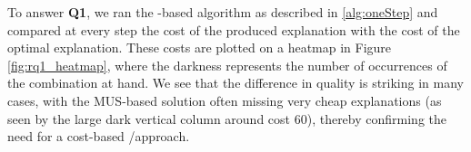 To answer \textbf{Q1}, we ran the -based algorithm as described in \cref{alg:oneStep} and compared at every step the cost of the produced explanation with the cost of the optimal explanation. 
% 
These costs are plotted on a heatmap in Figure \ref{fig:rq1_heatmap}, where the darkness represents the number of occurrences of the combination at hand. 
We see that the difference in quality is striking in many cases, with the MUS-based solution often missing very cheap explanations (as seen by the large dark vertical column around cost 60), thereby confirming the need for a cost-based \omus/\comus approach.
